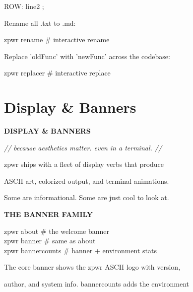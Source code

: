 \documentclass[11pt,a4paper,twoside]{book}
\begin{document}
ROW: line2 ;

Rename all .txt to .md:

\begin{codebox}
zpwr rename                         \# interactive rename\\
\end{codebox}

Replace 'oldFunc' with 'newFunc' across the codebase:

\begin{codebox}
zpwr replacer                       \# interactive replace\\
\end{codebox}


\vspace{16pt}

\section{Display \& Banners}


\vspace{10pt}
{\large\bfseries\color{neoncyan} DISPLAY \& BANNERS}\vspace{6pt}

{\small\itshape\color{dimtext} // because aesthetics matter. even in a terminal. //}

\begin{codebox}
zpwr ships with a fleet of display verbs that produce\\
\end{codebox}

ASCII art, colorized output, and terminal animations.

Some are informational. Some are just cool to look at.


\vspace{12pt}
{\bfseries\color{neonyellow} THE BANNER FAMILY}\vspace{4pt}

\begin{codebox}
zpwr about                          \# the welcome banner\\
zpwr banner                         \# same as about\\
zpwr bannercounts                   \# banner + environment stats\\
\end{codebox}

The core banner shows the zpwr ASCII logo with version,

author, and system info. bannercounts adds the environment
\end{document}
